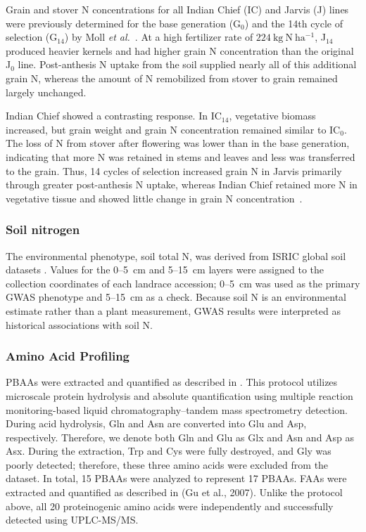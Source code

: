 Grain and stover N concentrations for all Indian Chief (IC) and Jarvis (J) lines were previously determined for the base generation (G$_0$) and the 14th cycle of selection (G$_{14}$) by Moll \textit{et al.}~\citep{Moll1994}. At a high fertilizer rate of $224~\mathrm{kg~N~ha^{-1}}$, J$_{14}$ produced heavier kernels and had higher grain N concentration than the original J$_0$ line. Post-anthesis N uptake from the soil supplied nearly all of this additional grain N, whereas the amount of N remobilized from stover to grain remained largely unchanged.

Indian Chief showed a contrasting response. In IC$_{14}$, vegetative biomass increased, but grain weight and grain N concentration remained similar to IC$_0$. The loss of N from stover after flowering was lower than in the base generation, indicating that more N was retained in stems and leaves and less was transferred to the grain. Thus, 14 cycles of selection increased grain N in Jarvis primarily through greater post-anthesis N uptake, whereas Indian Chief retained more N in vegetative tissue and showed little change in grain N concentration~\citep{Moll1994}.


\subsubsection{Soil nitrogen}
The environmental phenotype, soil total N, was derived from ISRIC global soil datasets \citep{Batjes2006ISRICWISE5ArcMin}. Values for the 0--5~cm and 5--15~cm layers were assigned to the collection coordinates of each landrace accession; 0--5~cm was used as the primary GWAS phenotype and 5--15~cm as a check. Because soil N is an environmental estimate rather than a plant measurement, GWAS results were interpreted as historical associations with soil N.


\subsubsection{Amino Acid Profiling}
PBAAs were extracted and quantified as described in \cite{Yobi2018PBAA}. This protocol utilizes microscale protein hydrolysis and absolute quantification using multiple reaction monitoring-based liquid chromatography–tandem mass spectrometry detection. During acid hydrolysis, Gln and Asn are converted into Glu and Asp, respectively. Therefore, we denote both Gln and Glu as Glx and Asn and Asp as Asx. During the extraction, Trp and Cys were fully destroyed, and Gly was poorly detected; therefore, these three amino acids were excluded from the dataset. In total, 15 PBAAs were analyzed to represent 17 PBAAs. FAAs were extracted and quantified as described in (Gu et al., 2007). Unlike the protocol above, all 20 proteinogenic amino acids were independently and successfully detected using UPLC-MS/MS.


